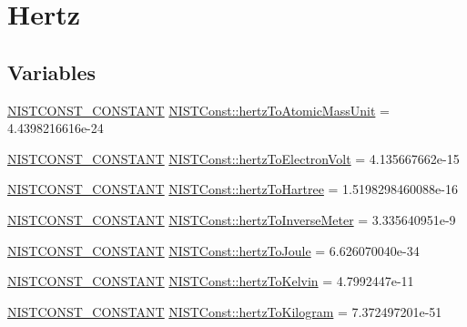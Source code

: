 \hypertarget{group___n_i_s_t_const-_hertz}{}\section{Hertz}
\label{group___n_i_s_t_const-_hertz}
\subsection*{Variables}
\begin{DoxyCompactItemize}
\item 
\mbox{\hyperlink{_n_i_s_t_const_8hpp_a2b0fc1d7452373f816175dd86ce26729}{N\+I\+S\+T\+C\+O\+N\+S\+T\+\_\+\+C\+O\+N\+S\+T\+A\+NT}} \mbox{\hyperlink{group___n_i_s_t_const-_hertz_ga101854ed16b02843a3371f5fdf2a6384}{N\+I\+S\+T\+Const\+::hertz\+To\+Atomic\+Mass\+Unit}} = 4.\+4398216616e-\/24
\item 
\mbox{\hyperlink{_n_i_s_t_const_8hpp_a2b0fc1d7452373f816175dd86ce26729}{N\+I\+S\+T\+C\+O\+N\+S\+T\+\_\+\+C\+O\+N\+S\+T\+A\+NT}} \mbox{\hyperlink{group___n_i_s_t_const-_hertz_ga6ba385dcccd89bf01d4ee18c3464e0ea}{N\+I\+S\+T\+Const\+::hertz\+To\+Electron\+Volt}} = 4.\+135667662e-\/15
\item 
\mbox{\hyperlink{_n_i_s_t_const_8hpp_a2b0fc1d7452373f816175dd86ce26729}{N\+I\+S\+T\+C\+O\+N\+S\+T\+\_\+\+C\+O\+N\+S\+T\+A\+NT}} \mbox{\hyperlink{group___n_i_s_t_const-_hertz_gadd5a8126aa55d959d52de9d86d9fe1d4}{N\+I\+S\+T\+Const\+::hertz\+To\+Hartree}} = 1.\+5198298460088e-\/16
\item 
\mbox{\hyperlink{_n_i_s_t_const_8hpp_a2b0fc1d7452373f816175dd86ce26729}{N\+I\+S\+T\+C\+O\+N\+S\+T\+\_\+\+C\+O\+N\+S\+T\+A\+NT}} \mbox{\hyperlink{group___n_i_s_t_const-_hertz_ga26a3ca41f2e8694656bfeb8886b60511}{N\+I\+S\+T\+Const\+::hertz\+To\+Inverse\+Meter}} = 3.\+335640951e-\/9
\item 
\mbox{\hyperlink{_n_i_s_t_const_8hpp_a2b0fc1d7452373f816175dd86ce26729}{N\+I\+S\+T\+C\+O\+N\+S\+T\+\_\+\+C\+O\+N\+S\+T\+A\+NT}} \mbox{\hyperlink{group___n_i_s_t_const-_hertz_ga9e555f96daf2b8abda55581bdeb8f20d}{N\+I\+S\+T\+Const\+::hertz\+To\+Joule}} = 6.\+626070040e-\/34
\item 
\mbox{\hyperlink{_n_i_s_t_const_8hpp_a2b0fc1d7452373f816175dd86ce26729}{N\+I\+S\+T\+C\+O\+N\+S\+T\+\_\+\+C\+O\+N\+S\+T\+A\+NT}} \mbox{\hyperlink{group___n_i_s_t_const-_hertz_ga223541915cf4faaf650c251803e78201}{N\+I\+S\+T\+Const\+::hertz\+To\+Kelvin}} = 4.\+7992447e-\/11
\item 
\mbox{\hyperlink{_n_i_s_t_const_8hpp_a2b0fc1d7452373f816175dd86ce26729}{N\+I\+S\+T\+C\+O\+N\+S\+T\+\_\+\+C\+O\+N\+S\+T\+A\+NT}} \mbox{\hyperlink{group___n_i_s_t_const-_hertz_ga1731a8968f69b7d2efe4ba24e8974172}{N\+I\+S\+T\+Const\+::hertz\+To\+Kilogram}} = 7.\+372497201e-\/51
\end{DoxyCompactItemize}


